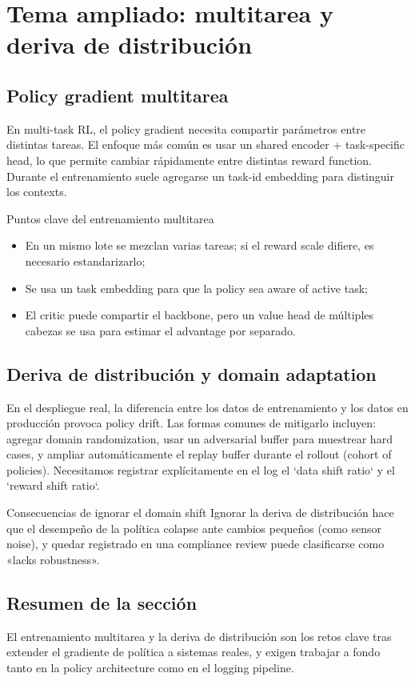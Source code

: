\section{Tema ampliado: multitarea y deriva de distribución}
\subsection{Policy gradient multitarea}
En multi-task RL, el policy gradient necesita compartir parámetros entre distintas tareas. El enfoque más común es usar un shared encoder + task-specific head, lo que permite cambiar rápidamente entre distintas reward function. Durante el entrenamiento suele agregarse un task-id embedding para distinguir los contexts.

\begin{knowledgebox}{Puntos clave del entrenamiento multitarea}
\begin{itemize}
    \item En un mismo lote se mezclan varias tareas; si el reward scale difiere, es necesario estandarizarlo;
    \item Se usa un task embedding para que la policy sea aware of active task;
    \item El critic puede compartir el backbone, pero un value head de múltiples cabezas se usa para estimar el advantage por separado.
\end{itemize}
\end{knowledgebox}

\subsection{Deriva de distribución y domain adaptation}
En el despliegue real, la diferencia entre los datos de entrenamiento y los datos en producción provoca policy drift. Las formas comunes de mitigarlo incluyen: agregar domain randomization, usar un adversarial buffer para muestrear hard cases, y ampliar automáticamente el replay buffer durante el rollout (cohort of policies). Necesitamos registrar explícitamente en el log el `data shift ratio` y el `reward shift ratio`.

\begin{warningbox}{Consecuencias de ignorar el domain shift}
Ignorar la deriva de distribución hace que el desempeño de la política colapse ante cambios pequeños (como sensor noise), y quedar registrado en una compliance review puede clasificarse como «lacks robustness».
\end{warningbox}

\subsection{Resumen de la sección}
El entrenamiento multitarea y la deriva de distribución son los retos clave tras extender el gradiente de política a sistemas reales, y exigen trabajar a fondo tanto en la policy architecture como en el logging pipeline.

